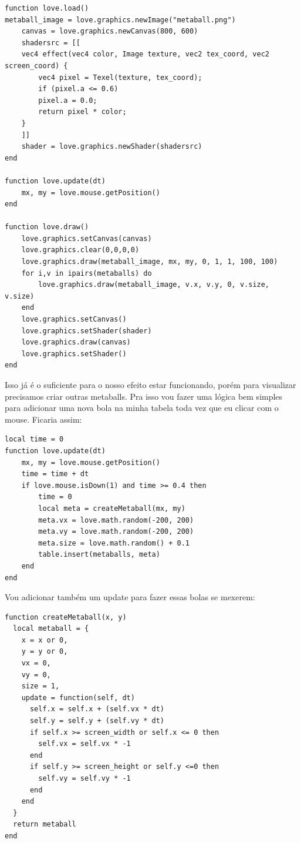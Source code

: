 \documentclass[a4paper,oneside,12pt]{article}
\begin{document}
\begin{lstlisting}[language={[5.2]Lua}]
function love.load()
metaball_image = love.graphics.newImage("metaball.png")
    canvas = love.graphics.newCanvas(800, 600)
    shadersrc = [[ 
    vec4 effect(vec4 color, Image texture, vec2 tex_coord, vec2 screen_coord) { 
        vec4 pixel = Texel(texture, tex_coord); 
        if (pixel.a <= 0.6)
        pixel.a = 0.0;
        return pixel * color;
    }
    ]]
    shader = love.graphics.newShader(shadersrc)
end

function love.update(dt)
    mx, my = love.mouse.getPosition()
end

function love.draw()
    love.graphics.setCanvas(canvas)
    love.graphics.clear(0,0,0,0)
    love.graphics.draw(metaball_image, mx, my, 0, 1, 1, 100, 100)
    for i,v in ipairs(metaballs) do
        love.graphics.draw(metaball_image, v.x, v.y, 0, v.size, v.size)
    end
    love.graphics.setCanvas()
    love.graphics.setShader(shader)
    love.graphics.draw(canvas)
    love.graphics.setShader()
end
\end{lstlisting}

Isso já é o suficiente para o nosso efeito estar funcionando, porém para visualizar precisamos criar outras metaballs. Pra isso vou fazer uma lógica bem simples para adicionar uma nova bola na minha tabela toda vez que eu clicar com o mouse. Ficaria assim:

\begin{lstlisting}[language={[5.2]Lua}]
local time = 0
function love.update(dt)
    mx, my = love.mouse.getPosition()
    time = time + dt
    if love.mouse.isDown(1) and time >= 0.4 then
        time = 0
        local meta = createMetaball(mx, my)
        meta.vx = love.math.random(-200, 200)
        meta.vy = love.math.random(-200, 200)
        meta.size = love.math.random() + 0.1
        table.insert(metaballs, meta)
    end
end
\end{lstlisting}

Vou adicionar também um update para fazer essas bolas se mexerem:

\begin{lstlisting}[language={[5.2]Lua}]
function createMetaball(x, y)
  local metaball = {
    x = x or 0,
    y = y or 0,
    vx = 0,
    vy = 0,
    size = 1,
    update = function(self, dt)
      self.x = self.x + (self.vx * dt) 
      self.y = self.y + (self.vy * dt) 
      if self.x >= screen_width or self.x <= 0 then 
        self.vx = self.vx * -1 
      end 
      if self.y >= screen_height or self.y <=0 then
        self.vy = self.vy * -1
      end
    end
  }
  return metaball
end
\end{lstlisting}
\end{document}
